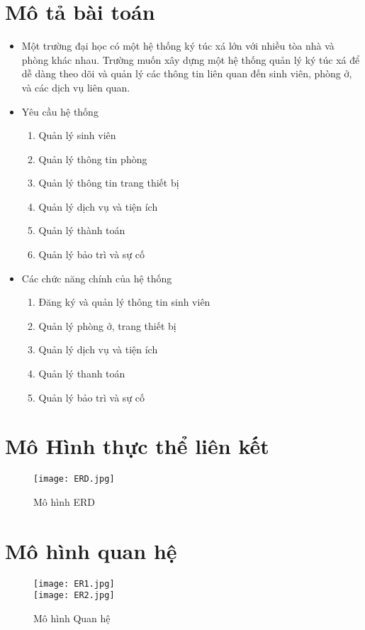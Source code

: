 \documentclass[a4paper,12pt]{article}
\begin{document}
\section{Mô tả bài toán}
\begin{itemize}
    \item Một trường đại học có một hệ thống ký túc xá lớn với nhiều tòa nhà và phòng khác nhau. Trường muốn xây dựng một hệ thống quản lý ký túc xá để dễ dàng theo dõi và quản lý các thông tin liên quan đến sinh viên, phòng ở, và các dịch vụ liên quan.
    \item Yêu cầu hệ thống
    \begin{enumerate}
        \item Quản lý sinh viên
        \item Quản lý thông tin phòng
        \item Quản lý thông tin trang thiết bị
        \item Quản lý dịch vụ và tiện ích
        \item Quản lý thành toán
        \item Quản lý bảo trì và sự cố
    \end{enumerate}
    \item Các chức năng chính của hệ thống
    \begin{enumerate}
        \item Đăng ký và quản lý thông tin sinh viên
        \item Quản lý phòng ở, trang thiết bị
        \item Quản lý dịch vụ và tiện ích
        \item Quản lý thanh toán
        \item Quản lý bảo trì và sự cố
    \end{enumerate}
\end{itemize}
\newpage
\section{Mô Hình thực thể liên kết}
\begin{figure}[tbh]
    \centering
    \texttt{[image: ERD.jpg]} %
    \caption{Mô hình ERD}
    \label{ERD}
\end{figure}

\section{Mô hình quan hệ}
\begin{figure}[tbh]
    \centering
    \texttt{[image: ER1.jpg]} 
\\ [1cm]
    \texttt{[image: ER2.jpg]}
    \caption{Mô hình Quan hệ}
    \label{ERD}
\end{figure}
\newpage
\end{document}

